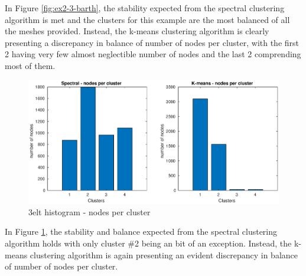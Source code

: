 \documentclass[unicode,11pt,a4paper,oneside,numbers=endperiod,openany]{scrartcl}
\begin{document}
In Figure \ref{fig:ex2-3-barth}, the stability expected from the spectral clustering algorithm
is met and the clusters for this example are the most balanced of all the meshes provided.
Instead, the k-means clustering algorithm is clearly presenting a discrepancy in balance of number of nodes
per cluster, with the first 2 having very few almost neglectible number of nodes
and the last 2 comprending most of them.

\begin{figure}[H]
    \centering
    \caption{3elt histogram - nodes per cluster}
    \label{fig:ex2-3-3elt}
    \includegraphics[width=\textwidth, trim={0cm 0cm 0cm 0cm}, clip]{./img/ex2-3-3elt.eps}
\end{figure}

In Figure \ref{fig:ex2-3-3elt}, the stability and balance expected from the spectral clustering algorithm
holds with only cluster \#2 being an bit of an exception.
Instead, the k-means clustering algorithm is again presenting an evident discrepancy in balance of number of nodes
per cluster.
\end{document}
